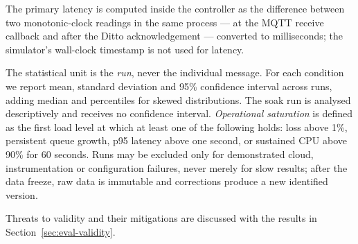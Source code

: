 The primary latency is computed inside the controller as the difference
between two monotonic-clock readings in the same process --- at the \ac{MQTT}
receive callback and after the Ditto acknowledgement --- converted to
milliseconds; the simulator's wall-clock timestamp is not used for latency.

The statistical unit is the \emph{run}, never the individual message. For each
condition we report mean, standard deviation and 95\% confidence interval
across runs, adding median and percentiles for skewed distributions. The soak
run is analysed descriptively and receives no confidence interval.
\emph{Operational saturation} is defined as the first load level at which at
least one of the following holds: loss above 1\%, persistent queue growth,
p95 latency above one second, or sustained \ac{CPU} above 90\% for 60
seconds. Runs may be excluded only for demonstrated cloud, instrumentation or
configuration failures, never merely for slow results; after the data freeze,
raw data is immutable and corrections produce a new identified version.

Threats to validity and their mitigations are discussed with the results in
Section~\ref{sec:eval-validity}.
